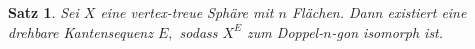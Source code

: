 \documentclass[12pt,titlepage,twoside,cleardoublepage]{article}
\theoremstyle{nummermitklammern}
\newtheorem{satz}[temp]{Satz}
\newtheorem{satz}[zahl]{Satz}
\numberwithin{equation}{section}
\begin{document}
\begin{comment}
Man muss die Kantensequenz $E$ in $Z$ nun so in eine Kantensequenz $E'$ in $X$ abändern, dass Anhängen des Tetraeders und Anwenden einer Kantendrehung vertauschbar sind.
\[
bild 
\] 
Sei dafür die Sphäre $X^0:=X$ und $X^i$ und die Kantensequenz $E_i=(e_1,\ldots,e_l)$ in $X$ für $0\leq i \leq m$ schon konstruiert. Sei $F$ die Fläche, die beim Entfernen des Tetraeders den Tetraeder ersetzt. Man führt folgende Fallunterscheidung durch
\begin{itemize}
\item Falls die Kante $e_i$ der Kantensequenz $E$ nicht zu F inzident ist, so wähle $X^{i+1}:={(X^i)}^{e_i}$ und $E_{i+1}:=(e_1,\ldots,e_l,e_i)$. Damit ist 
\[
T(Z^{(e_1,\ldots,e_l,e_i)})^F\cong X^{E_{i+1}}
\]
und für alle Ecken $V\in X^{E_{i+1}}$ gilt $deg_{X^{E_{i+1}}}(V)\geq deg_S(V)\geq 3,$ wobei $S=T(Y^{(e_1,\ldots,e_i)})^F$ ist.
\item Falls die Kante $e_i$ der Kantensequenz $E$ zu F inzident ist, muss man Kantendrehungen anwenden, die die oben erwähnte Vertauschbarkeit liefern. 
Seien $F_1,F_2,F_3,$ die zu $V^*$ inzidenten Flächen. Sei ohne Einschränkung $e_i<F_1$ und $e$ die Kante, die $\vert {(X^i)^{e_i}}_2(e)\cup \{F_1,F_2,F_3\}\vert =1$ erfüllt.
\[
bild
\]

Dann definiert man $X^{i+1}:={X^i}^{(e_i,e)}$ und $E^{i+1}:=(e'_1,\ldots,e_l',e_i,e').$ Dann ist ebenfalls
\[
T(Y^{(e_1,\ldots,e_i)})^F\cong X^{E_{i+1}}
\] 
\end{itemize}
Nach endlich vielen Schritten erhält man also eine Kantensequenz $E^*$ in $X$ sodass 
\[X^{E^*}\cong T(Z^E)^F \cong T((n-1)^2)^F
\]ist. 
Sei $e$ die Kante, die die beiden Ecken mit Grad 5 verbindet. Dann ist $(X^{E^*})^e\cong (n)^2.$ Für alle $V\in X_0 \setminus \{V^*\}$ gilt 
\[
deg_{X^E_{i}}(V)=geq deg_{T(Z^{(e_1,\ldots,e_i)})}(V)\geq 3.
\] 
und Anwenden der beiden Kantendrehungen im zweitem Fall sorgen, dafür das $deg(V^*)$ erst um 1 erhöht und dann um 1 verringert wird. Damit ist die Aussage gezeigt.
\end{proof}



Sei $X$ eine vertex-treue Sphäre und $E=(e_1,\ldots ,e_n)$ eine Kantensequenz in $X$. Man nennt $E$ eine vertex-treue Kantensequenz, falls für alle $1\leq i \leq n$ die Sphäre $X^{(e_1,\ldots,e_i)}$ vertex-treu ist.
\end{definition}
\end{comment}
\begin{satz}
Sei $X$ eine vertex-treue Sphäre mit $n$ Flächen. Dann existiert eine drehbare Kantensequenz $E,$ sodass $X^E$ zum Doppel-$n$-gon isomorph ist. 
\end{satz}
\end{document}
